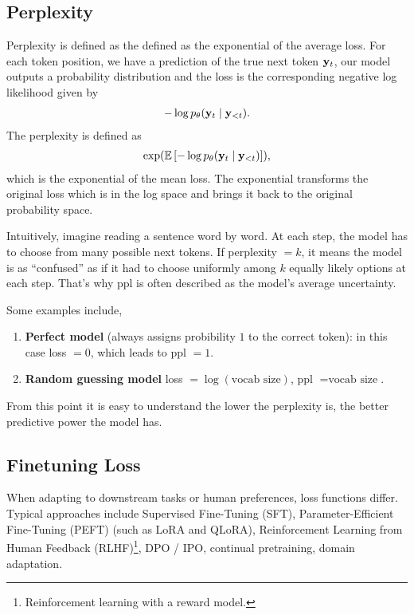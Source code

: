 \documentclass[11pt]{article}  %
\begin{document}
\subsection{Perplexity}
Perplexity is defined as the defined as the exponential of the average loss.
For each token position, we have a prediction of the true next token $\mathbf{y}_t$, our model outputs a probability distribution and the loss is the corresponding negative log likelihood given by 
\begin{align*}
  - \log p_{\theta}(\mathbf{y}_t \mid \mathbf{y}_{< t}).
\end{align*} 
The perplexity is defined as 
\begin{align*}
  \exp (\mathbb{E}\left[- \log p_{\theta}(\mathbf{y}_t \mid \mathbf{y}_{< t})\right]),
\end{align*}
which is the exponential of the mean loss.
The exponential transforms the original loss which is in the log space and brings it back to the original probability space.

Intuitively, imagine reading a sentence word by word.
At each step, the model has to choose from many possible next tokens. 
If perplexity $=k$, it means the model is as ``confused'' as if it had to choose uniformly among $k$ equally likely options at each step.
That's why ppl is often described as the model's average uncertainty.

Some examples include, 
\begin{enumerate}
  \item \textbf{Perfect model} (always assigns probibility $1$ to the correct token): in this case loss $=0$, which leads to ppl $=1$.
  \item \textbf{Random guessing model} loss $= \log(\text{vocab size})$, ppl $= \text{vocab size}$.
\end{enumerate}
From this point it is easy to understand the lower the perplexity is, the better predictive power the model has.




\subsection{Finetuning Loss}
When adapting to downstream tasks or human preferences, loss functions differ.
Typical approaches include Supervised Fine-Tuning (SFT), Parameter-Efficient Fine-Tuning (PEFT) (such as LoRA and QLoRA), Reinforcement Learning from Human Feedback (RLHF)\footnote{Reinforcement learning with a reward model.}, DPO / IPO, continual pretraining, domain adaptation.
\end{document}
